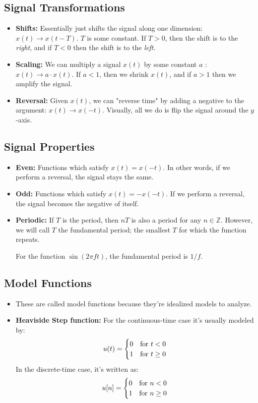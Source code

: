 \subsection{Signal Transformations}
\begin{itemize}
	\item \textbf{Shifts:} Essentially just shifts the signal along one dimension: \( x(t) \to x(t - T) \). \( T \) 
		is some constant. If  \( T > 0 \), then the shift is to the \textit{right}, and if \( T < 0 \) then 
		the shift is to the \textit{left}.
	\item \textbf{Scaling:} We can multiply a signal \( x(t)  \) by some constant \( a \) : \( x(t) \to a\cdot x(t) \).
		If \( a < 1 \), then we shrink \( x(t) \), and if \(  a > 1 \) then we amplify the signal. 
	\item \textbf{Reversal:} Given \( x(t) \), we can "reverse time" by adding a negative to the argument: \( x(t)
		\to x(-t)\). Visually, all we do is flip the signal around the \( y \)-axis.  
\end{itemize}
\subsection{Signal Properties}
\begin{itemize}
	\item \textbf{Even:} Functions which satisfy \( x(t) = x(-t) \). In other words, if we perform a reversal, the 
		signal stays the same.
	\item \textbf{Odd:} Functions which satisfy \( x(t) = -x(-t) \). If we perform a reversal, the signal becomes the 
		negative of itself.
	\item \textbf{Periodic:} If \( T \) is the period, then \( nT \) is also a period for any \( n \in \mathbb Z \).
		However, we will call \( T \) the fundamental period; the smallest \( T \) for which the function 
		repeats. 

		For the function \( \sin(2 \pi ft) \), the fundamental period is \( 1 / f \).  
\end{itemize}
\subsection{Model Functions}
\begin{itemize}
	\item These are called model functions because they're idealized models to analyze. 
	\item \textbf{Heaviside Step function:} For the continuous-time case it's usually modeled by:
		\[
		u(t) = \begin{cases}
			0 & \text{for \( t < 0 \)}\\
			1 & \text{for \( t \ge 0 \)}
		\end{cases}
		\] 
		In the discrete-time case, it's written as:
		\[
			u[n] = \begin{cases}
				0 & \text{for \( n < 0 \)}\\
				1 & \text{for \(n \ge  0\)}
			\end{cases}
		\] 
\end{itemize}



